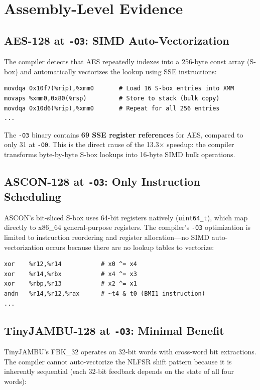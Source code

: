 \documentclass[11pt,a4paper]{article}
\begin{document}
\section{Assembly-Level Evidence}

\subsection{AES-128 at {\tt -O3}: SIMD Auto-Vectorization}

The compiler detects that AES repeatedly indexes into a 256-byte const array (S-box) and automatically vectorizes the lookup using SSE instructions:

\begin{lstlisting}
movdqa 0x10f7(%rip),%xmm0       # Load 16 S-box entries into XMM
movaps %xmm0,0x80(%rsp)         # Store to stack (bulk copy)
movdqa 0x10d6(%rip),%xmm0       # Repeat for all 256 entries
...
\end{lstlisting}

The {\tt -O3} binary contains \textbf{69 SSE register references} for AES, compared to only 31 at {\tt -O0}. This is the direct cause of the 13.3$\times$ speedup: the compiler transforms byte-by-byte S-box lookups into 16-byte SIMD bulk operations.

\subsection{ASCON-128 at {\tt -O3}: Only Instruction Scheduling}

ASCON's bit-sliced S-box uses 64-bit registers natively ({\tt uint64\_t}), which map directly to x86\_64 general-purpose registers. The compiler's {\tt -O3} optimization is limited to instruction reordering and register allocation---no SIMD auto-vectorization occurs because there are no lookup tables to vectorize:

\begin{lstlisting}
xor    %r12,%r14           # x0 ^= x4
xor    %r14,%rbx           # x4 ^= x3
xor    %rbp,%r13           # x2 ^= x1
andn   %r14,%r12,%rax      # ~t4 & t0 (BMI1 instruction)
...
\end{lstlisting}

\subsection{TinyJAMBU-128 at {\tt -O3}: Minimal Benefit}

TinyJAMBU's FBK\_32 operates on 32-bit words with cross-word bit extractions. The compiler cannot auto-vectorize the NLFSR shift pattern because it is inherently sequential (each 32-bit feedback depends on the state of all four words):
\end{document}
